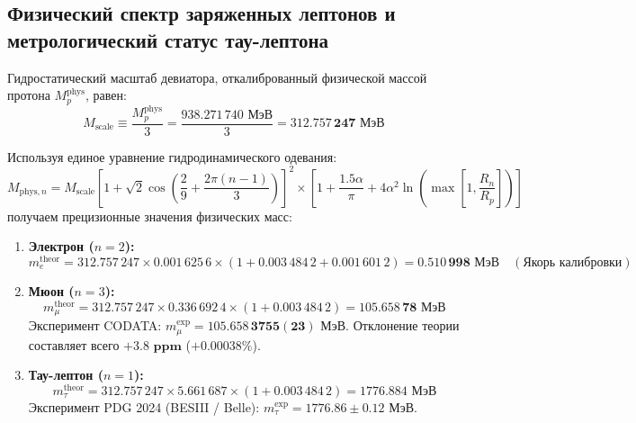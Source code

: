 \documentclass[12pt,a4paper]{article}
\begin{document}
	\subsection{Физический спектр заряженных лептонов и метрологический статус тау-лептона}
	
	Гидростатический масштаб девиатора, откалиброванный физической массой протона $M_p^{\text{phys}}$, равен:
	\begin{equation}
		M_{\text{scale}} \equiv \frac{M_p^{\text{phys}}}{3} = \frac{938.271\,740 \text{ МэВ}}{3} = \mathbf{312.757\,247 \text{ МэВ}}
	\end{equation}
	
	Используя единое уравнение гидродинамического одевания:
	\begin{equation}
		M_{\text{phys}, n} = M_{\text{scale}} \left[ 1 + \sqrt{2} \cos\left( \frac{2}{9} + \frac{2\pi(n-1)}{3} \right) \right]^2 \times \left[ 1 + \frac{1.5 \alpha}{\pi} + 4 \alpha^2 \ln\left( \max\left[ 1, \frac{R_n}{R_p} \right] \right) \right]
	\end{equation}
	получаем прецизионные значения физических масс:
	
	\begin{enumerate}
		\item \textbf{Электрон ($n=2$):}
		\begin{equation}
			m_e^{\text{theor}} = 312.757\,247 \times 0.001\,625\,6 \times (1 + 0.003\,484\,2 + 0.001\,601\,2) = \mathbf{0.510\,998 \text{ МэВ}} \quad (\text{Якорь калибровки})
		\end{equation}
		
		\item \textbf{Мюон ($n=3$):}
		\begin{equation}
			m_\mu^{\text{theor}} = 312.757\,247 \times 0.336\,692\,4 \times (1 + 0.003\,484\,2) = \mathbf{105.658\,78 \text{ МэВ}}
		\end{equation}
		Эксперимент CODATA: $m_\mu^{\text{exp}} = \mathbf{105.658\,3755(23) \text{ МэВ}}$. Отклонение теории составляет всего $\mathbf{+3.8 \text{ ppm}}$ ($+0.00038\%$).
		
		\item \textbf{Тау-лептон ($n=1$):}
		\begin{equation}
			m_\tau^{\text{theor}} = 312.757\,247 \times 5.661\,687 \times (1 + 0.003\,484\,2) = \mathbf{1776.884 \text{ МэВ}}
		\end{equation}
		Эксперимент PDG 2024 (BESIII / Belle): $m_\tau^{\text{exp}} = \mathbf{1776.86 \pm 0.12 \text{ МэВ}}$. 
	\end{enumerate}
	
\end{document}
